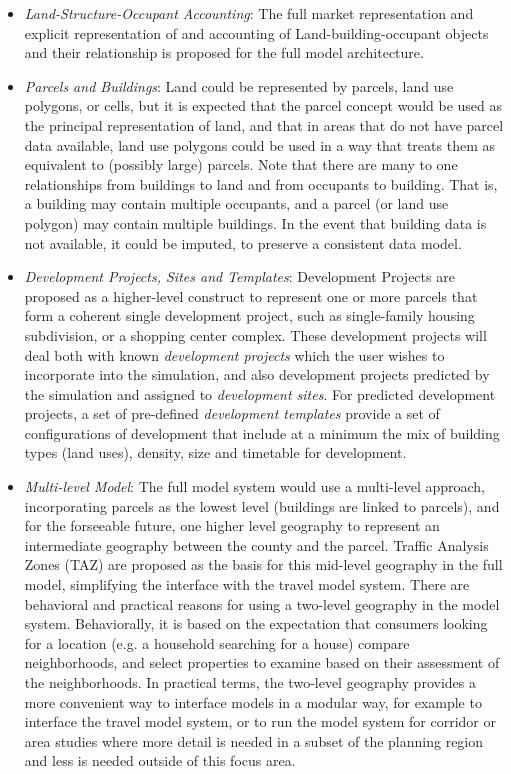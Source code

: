 \begin{itemize}

\item \emph{Land-Structure-Occupant Accounting}: The full market
representation and explicit representation of and accounting of
Land-building-occupant objects and their relationship is proposed
for the full model architecture.

\item \emph{Parcels and Buildings}: Land could be represented by
parcels, land use polygons, or cells, but it is expected that
the parcel concept would be used as the principal representation
of land, and that in areas that do not have parcel data available,
land use polygons could be used in a way that treats them as
equivalent to (possibly large) parcels.  Note that there are many
to one relationships from buildings to land and from occupants to
building.  That is, a building may contain multiple occupants,
and a parcel (or land use polygon) may contain multiple buildings.
In the event that building data is not available, it could be
imputed, to preserve a consistent data model.

\item \emph{Development Projects, Sites and Templates}: Development
 Projects are proposed as a higher-level construct to represent
 one or more parcels that form a coherent single development
 project, such as single-family housing subdivision, or a shopping
 center complex.  These development projects will deal both with
 known \emph{development projects} which the user wishes to
 incorporate into the simulation, and also development projects
 predicted by the simulation and assigned to \emph{development
 sites}.  For predicted development projects, a set of pre-defined
  \emph{development templates} provide a set of configurations of
  development that include at a minimum the mix of building types
  (land uses), density, size and timetable for development.

\item \emph{Multi-level Model}: The full model system would use
a multi-level approach, incorporating parcels as the lowest level
(buildings are linked to parcels), and for the forseeable future,
one higher level geography to represent an intermediate geography
between the county and the parcel.  Traffic Analysis Zones (TAZ)
are proposed as the basis for this mid-level geography in the full
 model, simplifying the interface with the travel model system.
 There are behavioral and practical reasons for using a two-level
 geography in the model system.  Behaviorally, it is based on the
 expectation that consumers looking for a location (e.g. a household
  searching for a house) compare neighborhoods, and select properties
  to examine based on their assessment of the neighborhoods. In
  practical terms, the two-level geography provides a more convenient
  way to interface models in a modular way, for example to interface
  the travel model system, or to run the model system for corridor or
  area studies where more detail is needed in a subset of the planning
  region and less is needed outside of this focus area.


\end{itemize}
